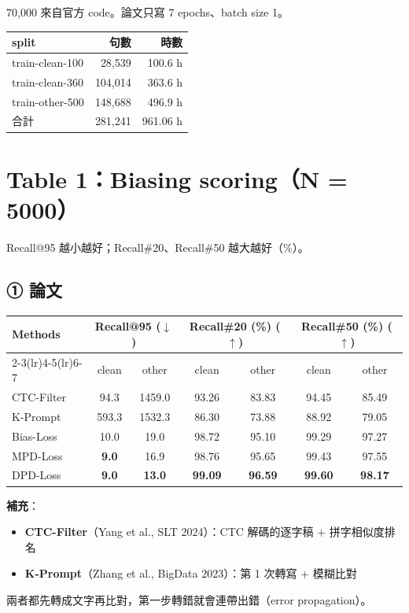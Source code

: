 \documentclass[11pt,a4paper]{article}
\begin{document}
70,000 來自官方 code。論文只寫 7 epochs、batch size 1。

{\small
\begin{tabular}{lrr}
\toprule
split & 句數 & 時數 \\
\midrule
train-clean-100 & 28,539 & 100.6 h \\
train-clean-360 & 104,014 & 363.6 h \\
train-other-500 & 148,688 & 496.9 h \\
\midrule
合計 & 281,241 & 961.06 h \\
\bottomrule
\end{tabular}
}

\clearpage
\section*{Table 1：Biasing scoring（N = 5000）}

Recall@95 越小越好；Recall\#20、Recall\#50 越大越好（\%）。

\subsection*{① 論文}

\begin{center}
\begin{tabular}{lcccccc}
\toprule
\multirow{2}{*}{\textbf{Methods}} & \multicolumn{2}{c}{\textbf{Recall@95} ($\downarrow$)} & \multicolumn{2}{c}{\textbf{Recall\#20} (\%) ($\uparrow$)} & \multicolumn{2}{c}{\textbf{Recall\#50} (\%) ($\uparrow$)} \\
\cmidrule(lr){2-3}\cmidrule(lr){4-5}\cmidrule(lr){6-7}
 & clean & other & clean & other & clean & other \\
\midrule
CTC-Filter & 94.3 & 1459.0 & 93.26 & 83.83 & 94.45 & 85.49 \\
K-Prompt   & 593.3 & 1532.3 & 86.30 & 73.88 & 88.92 & 79.05 \\
\midrule
Bias-Loss  & 10.0 & 19.0 & 98.72 & 95.10 & 99.29 & 97.27 \\
MPD-Loss   & \textbf{9.0} & 16.9 & 98.76 & 95.65 & 99.43 & 97.55 \\
DPD-Loss   & \textbf{9.0} & \textbf{13.0} & \textbf{99.09} & \textbf{96.59} & \textbf{99.60} & \textbf{98.17} \\
\bottomrule
\end{tabular}
\end{center}

\textbf{補充}：
\begin{itemize}[leftmargin=1.5em, itemsep=0pt]
  \item \textbf{CTC-Filter}（Yang et al., SLT 2024）：CTC 解碼的逐字稿 + 拼字相似度排名
  \item \textbf{K-Prompt}（Zhang et al., BigData 2023）：第 1 次轉寫 + 模糊比對
\end{itemize}
兩者都先轉成文字再比對，第一步轉錯就會連帶出錯（error propagation）。
\end{document}
